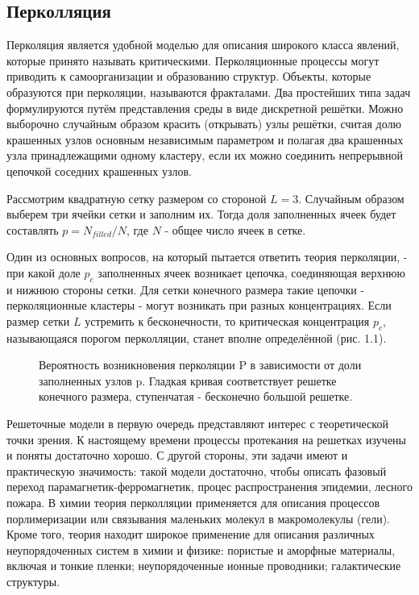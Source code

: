 \documentclass[14pt,a4paper,report]{ncc}
\begin{document}
\subsection{Перколляция}
Перколяция является удобной моделью для описания широкого класса явлений, которые принято называть критическими. Перколяционные процессы могут приводить к самоорганизации и образованию структур. Объекты, которые образуются при перколяции, называются фракталами. Два простейших типа задач формулируются путём представления среды в виде дискретной решётки. Можно выборочно случайным образом красить (открывать) узлы решётки, считая долю крашенных узлов основным независимым параметром и полагая два крашенных узла принадлежащими одному кластеру, если их можно соединить непрерывной цепочкой соседних крашенных узлов.
\

Рассмотрим квадратную сетку размером со стороной $L=3$. Случайным образом выберем три ячейки сетки и заполним их. Тогда доля заполненных ячеек будет составлять $p={N_{filled}}/N$, где $N$ - общее число ячеек в сетке.
\

Один из основных вопросов, на который пытается ответить теория перколяции, - при какой доле $p_c$ заполненных ячеек возникает цепочка, соединяющая верхнюю и нижнюю стороны сетки. Для сетки конечного размера такие цепочки - перколяционные кластеры - могут возникать при разных концентрациях. Если размер сетки $L$ устремить к бесконечности, то критическая концентрация $p_c$, называющаяся порогом перколляции, станет вполне определённой (рис. 1.1). 
\begin{figure}[!h]
\caption{Вероятность возникновения перколяции P в зависимости от доли заполненных узлов p. Гладкая кривая соответствует решетке конечного размера, ступенчатая - бесконечно большой решетке.}
\end{figure}

Решеточные модели в первую очередь представляют интерес с теоретической точки зрения. К настоящему времени процессы протекания на решетках изучены и поняты достаточно хорошо. С другой стороны, эти задачи имеют и практическую значимость: такой модели достаточно, чтобы описать фазовый переход парамагнетик-ферромагнетик, процес распространения эпидемии, лесного пожара. В химии теория перколляции применяется для описания процессов порлимеризации или связывания маленьких молекул в макромолекулы (гели). Кроме того, теория находит широкое применение для описания различных неупорядоченных систем в химии и физике: пористые и аморфные материалы, включая и тонкие пленки; неупорядоченные ионные проводники; галактические структуры.
\ 
\end{document}
